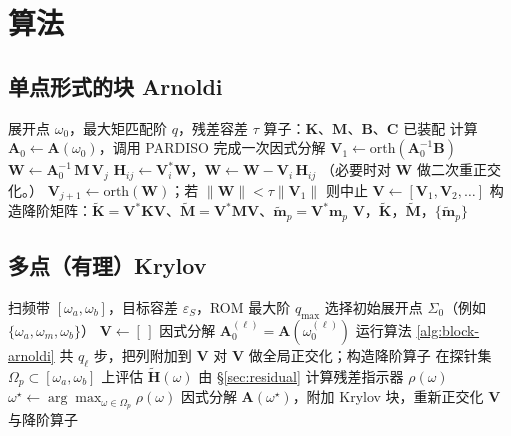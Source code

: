 \documentclass[11pt,a4paper]{ctexart}
\begin{document}
\section{算法}

\subsection{单点形式的块 Arnoldi}

\begin{algorithm}[h]
\caption{块 Arnoldi（单点 Krylov MOR）}
\label{alg:block-arnoldi}
\begin{algorithmic}[1]
\Require 展开点 $\omega_0$，最大矩匹配阶 $q$，残差容差 $\tau$
\Statex 算子：$\bm K$、$\bm M$、$\bm B$、$\bm C$ 已装配
\State 计算 $\bm A_0 \gets \bm A(\omega_0)$，调用 PARDISO 完成一次因式分解
\State $\bm V_1 \gets \mathrm{orth}(\bm A_0^{-1} \bm B)$
  \State $\bm W \gets \bm A_0^{-1}\,\bm M\,\bm V_j$
    \State $\bm H_{ij}\gets \bm V_i^{\!*}\bm W$，\quad $\bm W\gets \bm W - \bm V_i\,\bm H_{ij}$
  \EndFor
  \State （必要时对 $\bm W$ 做二次重正交化。）
  \State $\bm V_{j+1} \gets \mathrm{orth}(\bm W)$；若 $\|\bm W\| < \tau\|\bm V_1\|$ 则中止
\EndFor
\State $\bm V \gets [\bm V_1,\bm V_2,\ldots]$
\State 构造降阶矩阵：$\widetilde{\bm K}\!=\!\bm V^{\!*}\bm K\bm V$、$\widetilde{\bm M}\!=\!\bm V^{\!*}\bm M\bm V$、$\widetilde{\bm m}_p\!=\!\bm V^{\!*}\bm m_p$
\State \Return $\bm V$，$\widetilde{\bm K}$，$\widetilde{\bm M}$，$\{\widetilde{\bm m}_p\}$
\end{algorithmic}
\end{algorithm}

\subsection{多点（有理）Krylov}

\begin{algorithm}[h]
\caption{自适应有理 Krylov MOR 扫频}
\label{alg:rational-krylov}
\begin{algorithmic}[1]
\Require 扫频带 $[\omega_a,\omega_b]$，目标容差 $\varepsilon_S$，ROM 最大阶 $q_{\max}$
\State 选择初始展开点 $\Sigma_0$（例如 $\{\omega_a,\omega_m,\omega_b\}$）
\State $\bm V \gets [\,]$
  \State 因式分解 $\bm A_0^{(\ell)} = \bm A(\omega_0^{(\ell)})$
  \State 运行算法 \ref{alg:block-arnoldi} 共 $q_\ell$ 步，把列附加到 $\bm V$
\EndFor
\State 对 $\bm V$ 做全局正交化；构造降阶算子
\Repeat
  \State 在探针集 $\Omega_p\subset[\omega_a,\omega_b]$ 上评估 $\widetilde{\bm H}(\omega)$
  \State 由 \S\ref{sec:residual} 计算残差指示器 $\rho(\omega)$
  \State $\omega^\star \gets \arg\max_{\omega\in\Omega_p}\rho(\omega)$
    \State 因式分解 $\bm A(\omega^\star)$，附加 Krylov 块，重新正交化
  \EndIf
{}
\State \Return $\bm V$ 与降阶算子
\end{algorithmic}
\end{algorithm}
\end{document}
